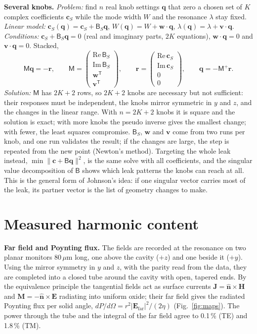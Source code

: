 \documentclass[11pt]{article}
\begin{document}
\textbf{Several knobs.} \emph{Problem:} find $n$ real knob settings $\mathbf q$ that zero a chosen set of $K$ complex coefficients $\mathbf c_S$ while the mode width $W$ and the resonance $\lambda$ stay fixed. \emph{Linear model:} $\mathbf c_S(\mathbf q)=\mathbf c_S+\mathsf B_S\mathbf q$, $W(\mathbf q)=W+\mathbf w\cdot\mathbf q$, $\lambda(\mathbf q)=\lambda+\mathbf v\cdot\mathbf q$. \emph{Conditions:} $\mathbf c_S+\mathsf B_S\mathbf q=0$ (real and imaginary parts, $2K$ equations), $\mathbf w\cdot\mathbf q=0$ and $\mathbf v\cdot\mathbf q=0$. Stacked,
\begin{equation}
\mathsf M\mathbf q=-\mathbf r,\qquad
\mathsf M=\begin{pmatrix}\mathrm{Re}\,\mathsf B_S\\ \mathrm{Im}\,\mathsf B_S\\ \mathbf w^{\mathsf T}\\ \mathbf v^{\mathsf T}\end{pmatrix},\qquad
\mathbf r=\begin{pmatrix}\mathrm{Re}\,\mathbf c_S\\ \mathrm{Im}\,\mathbf c_S\\ 0\\ 0\end{pmatrix},\qquad
\mathbf q=-\mathsf M^{+}\mathbf r .
\end{equation}
\emph{Solution:} $\mathsf M$ has $2K+2$ rows, so $2K+2$ knobs are necessary but not sufficient: their responses must be independent, the knobs mirror symmetric in $y$ and $z$, and the changes in the linear range. With $n=2K+2$ knobs it is square and the solution is exact; with more knobs the pseudo inverse gives the smallest change; with fewer, the least squares compromise. $\mathsf B_S$, $\mathbf w$ and $\mathbf v$ come from two runs per knob, and one run validates the result; if the changes are large, the step is repeated from the new point (Newton's method). Targeting the whole leak instead, $\min\|\mathbf c+\mathsf B\mathbf q\|^2$, is the same solve with all coefficients, and the singular value decomposition of $\mathsf B$ shows which leak patterns the knobs can reach at all. This is the general form of Johnson's idea: if one singular vector carries most of the leak, its partner vector is the list of geometry changes to make.

\section{Measured harmonic content}
\textbf{Far field and Poynting flux.} The fields are recorded at the resonance on two planar monitors 80\,$\mu$m long, one above the cavity ($+z$) and one beside it ($+y$). Using the mirror symmetry in $y$ and $z$, with the parity read from the data, they are completed into a closed tube around the cavity with open, tapered ends. By the equivalence principle the tangential fields act as surface currents $\mathbf J=\hat{\mathbf n}\times\mathbf H$ and $\mathbf M=-\hat{\mathbf n}\times\mathbf E$ radiating into uniform oxide; their far field gives the radiated Poynting flux per solid angle, $dP/d\Omega=r^2|\mathbf E_\mathrm{far}|^2/(2\eta)$ (Fig.~\ref{fig:maps}). The power through the tube and the integral of the far field agree to 0.1\,\% (TE) and 1.8\,\% (TM).
\end{document}
